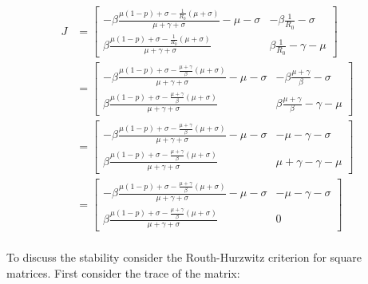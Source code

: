   \begin{align*}
    J &= \begin{bmatrix}-\beta\frac{\mu(1-p) + \sigma - \frac{1}{R_0}(\mu+\sigma)}{\mu + \gamma+ \sigma} -\mu - \sigma & -\beta\frac{1}{R_0}-\sigma\\\beta\frac{\mu(1-p) + \sigma - \frac{1}{R_0}(\mu+\sigma)}{\mu + \gamma+ \sigma} & \beta\frac{1}{R_0} - \gamma - \mu\end{bmatrix}\\
      &= \begin{bmatrix}-\beta\frac{\mu(1-p) + \sigma - \frac{\mu+\gamma}{\beta}(\mu+\sigma)}{\mu + \gamma+ \sigma} -\mu - \sigma & -\beta\frac{\mu+\gamma}{\beta}-\sigma\\\beta\frac{\mu(1-p) + \sigma - \frac{\mu+\gamma}{\beta}(\mu+\sigma)}{\mu + \gamma+ \sigma} & \beta\frac{\mu+\gamma}{\beta} - \gamma - \mu\end{bmatrix}\\
      &= \begin{bmatrix}-\beta\frac{\mu(1-p) + \sigma - \frac{\mu+\gamma}{\beta}(\mu+\sigma)}{\mu + \gamma+ \sigma} -\mu - \sigma & -\mu-\gamma-\sigma\\\beta\frac{\mu(1-p) + \sigma - \frac{\mu+\gamma}{\beta}(\mu+\sigma)}{\mu + \gamma+ \sigma} & \mu+\gamma - \gamma - \mu\end{bmatrix}\\
      &= \begin{bmatrix}-\beta\frac{\mu(1-p) + \sigma - \frac{\mu+\gamma}{\beta}(\mu+\sigma)}{\mu + \gamma+ \sigma} -\mu - \sigma & -\mu-\gamma-\sigma\\\beta\frac{\mu(1-p) + \sigma - \frac{\mu+\gamma}{\beta}(\mu+\sigma)}{\mu + \gamma+ \sigma} & 0\end{bmatrix}\\
  \end{align*}

  To discuss the stability consider the Routh-Hurzwitz criterion for square matrices.
  First consider the trace of the matrix:


